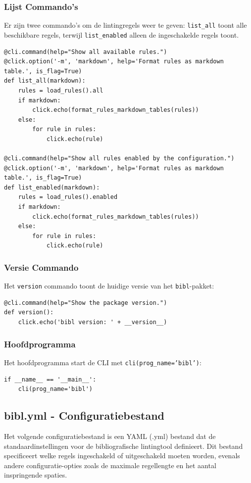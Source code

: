 \subsubsection{Lijst Commando's}

Er zijn twee commando's om de lintingregels weer te geven: \texttt{list\_all} toont alle beschikbare regels, terwijl \texttt{list\_enabled} alleen de ingeschakelde regels toont.

\begin{verbatim}
@cli.command(help="Show all available rules.")
@click.option('-m', 'markdown', help='Format rules as markdown table.', is_flag=True)
def list_all(markdown):
    rules = load_rules().all
    if markdown:
        click.echo(format_rules_markdown_tables(rules))
    else:
        for rule in rules:
            click.echo(rule)

@cli.command(help="Show all rules enabled by the configuration.")
@click.option('-m', 'markdown', help='Format rules as markdown table.', is_flag=True)
def list_enabled(markdown):
    rules = load_rules().enabled
    if markdown:
        click.echo(format_rules_markdown_tables(rules))
    else:
        for rule in rules:
            click.echo(rule)
\end{verbatim}

\subsubsection{Versie Commando}

Het \texttt{version} commando toont de huidige versie van het \texttt{bibl}-pakket:

\begin{verbatim}
@cli.command(help="Show the package version.")
def version():
    click.echo('bibl version: ' + __version__)
\end{verbatim}

\subsubsection{Hoofdprogramma}

Het hoofdprogramma start de CLI met \texttt{cli(prog\_name='bibl')}:

\begin{verbatim}
if __name__ == '__main__':
    cli(prog_name='bibl')
\end{verbatim}
\subsection{bibl.yml - Configuratiebestand}
Het volgende configuratiebestand is een YAML (.yml) bestand dat de standaardinstellingen voor de bibliografische lintingtool definieert. Dit bestand specificeert welke regels ingeschakeld of uitgeschakeld moeten worden, evenals andere configuratie-opties zoals de maximale regellengte en het aantal inspringende spaties.

